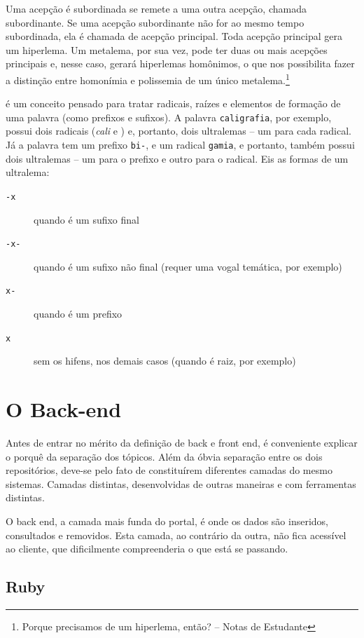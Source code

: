 Uma acepção é subordinada se remete a uma outra acepção, chamada subordinante. Se uma acepção
subordinante não for ao mesmo tempo subordinada, ela é chamada de acepção principal. Toda
acepção principal gera um hiperlema. Um metalema, por sua vez, pode ter duas ou mais acepções
principais e, nesse caso, gerará hiperlemas homônimos, o que nos possibilita fazer a distinção
entre homonímia e polissemia de um único metalema.\footnote{Porque precisamos de um hiperlema,
então? -- Notas de Estudante}

 é um conceito pensado para tratar radicais, raízes e elementos de formação de
uma palavra (como prefixos e sufixos). A palavra \texttt{caligrafia}, por exemplo, possui dois
radicais (\emph{cali} e ) e, portanto, dois ultralemas – um para cada radical. Já
a palavra  tem um prefixo \texttt{bi-}, e um radical \texttt{gamia}, e portanto,
também possui dois ultralemas – um para o prefixo e outro para o radical. Eis as formas de um
ultralema:
\begin{description}
    \item[\texttt{-x}] quando é um sufixo final
    \item[\texttt{-x-}] quando é um sufixo não final (requer uma vogal temática, por
    exemplo)
    \item[\texttt{x-}] quando é um prefixo
    \item[\texttt{x}] sem os hifens, nos demais casos (quando é raiz, por exemplo)
\end{description}

\section{O Back-end}
\label{sec:back-end}

Antes de entrar no mérito da definição de back e front end, é conveniente explicar o porquê da
separação dos tópicos. Além da óbvia separação entre os dois repositórios, deve-se pelo fato de
constituírem diferentes camadas do mesmo sistemas. Camadas distintas, desenvolvidas de outras
maneiras e com ferramentas distintas.

O back end, a camada mais funda do portal, é onde os dados são inseridos, consultados e removidos.
Esta camada, ao contrário da outra, não fica acessível ao cliente, que dificilmente compreenderia
o que está se passando.

\subsection{Ruby}
\label{subsec:ruby}

